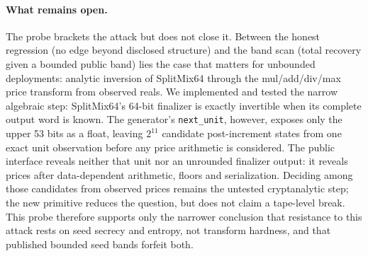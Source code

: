 \paragraph{What remains open.} The probe brackets the attack but does not close it. Between the honest regression (no edge beyond disclosed structure) and the band scan (total recovery given a bounded public band) lies the case that matters for unbounded deployments: analytic inversion of SplitMix64 \citep{steele2014splittable} through the mul/add/div/max price transform from observed reals. We implemented and tested the narrow algebraic step: SplitMix64's 64-bit finalizer is exactly invertible when its complete output word is known. The generator's \texttt{next\_unit}, however, exposes only the upper 53 bits as a float, leaving $2^{11}$ candidate post-increment states from one exact unit observation before any price arithmetic is considered. The public interface reveals neither that unit nor an unrounded finalizer output: it reveals prices after data-dependent arithmetic, floors and serialization. Deciding among those candidates from observed prices remains the untested cryptanalytic step; the new primitive reduces the question, but does not claim a tape-level break. This probe therefore supports only the narrower conclusion that resistance to this attack rests on seed secrecy and entropy, not transform hardness, and that published bounded seed bands forfeit both.
